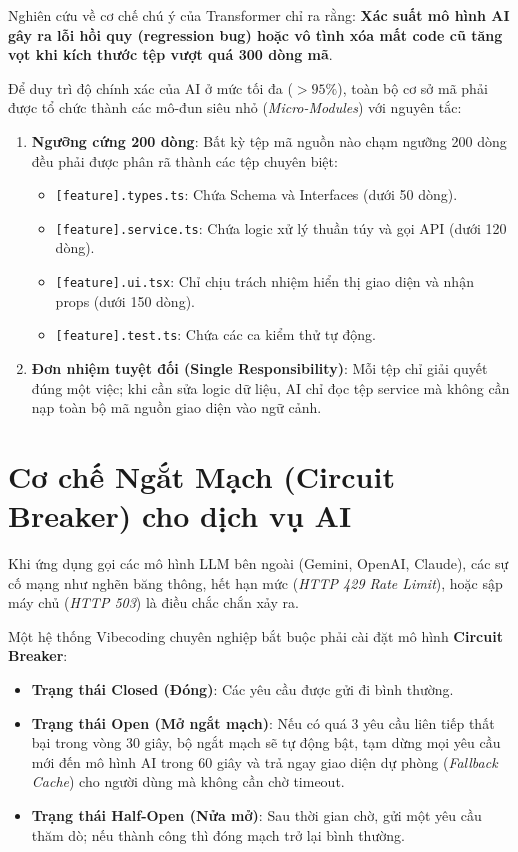 \documentclass[a4paper,11pt]{article}
\begin{document}
Nghiên cứu về cơ chế chú ý của Transformer chỉ ra rằng: \textbf{Xác suất mô hình AI gây ra lỗi hồi quy (regression bug) hoặc vô tình xóa mất code cũ tăng vọt khi kích thước tệp vượt quá 300 dòng mã}.

Để duy trì độ chính xác của AI ở mức tối đa ($> 95\%$), toàn bộ cơ sở mã phải được tổ chức thành các mô-đun siêu nhỏ (\textit{Micro-Modules}) với nguyên tắc:
\begin{enumerate}[label={\arabic*.}]
    \item \textbf{Ngưỡng cứng 200 dòng}: Bất kỳ tệp mã nguồn nào chạm ngưỡng 200 dòng đều phải được phân rã thành các tệp chuyên biệt:
    \begin{itemize}
        \item \texttt{[feature].types.ts}: Chứa Schema và Interfaces (dưới 50 dòng).
        \item \texttt{[feature].service.ts}: Chứa logic xử lý thuần túy và gọi API (dưới 120 dòng).
        \item \texttt{[feature].ui.tsx}: Chỉ chịu trách nhiệm hiển thị giao diện và nhận props (dưới 150 dòng).
        \item \texttt{[feature].test.ts}: Chứa các ca kiểm thử tự động.
    \end{itemize}
    \item \textbf{Đơn nhiệm tuyệt đối (Single Responsibility)}: Mỗi tệp chỉ giải quyết đúng một việc; khi cần sửa logic dữ liệu, AI chỉ đọc tệp service mà không cần nạp toàn bộ mã nguồn giao diện vào ngữ cảnh.
\end{enumerate}

\section{Cơ chế Ngắt Mạch (Circuit Breaker) cho dịch vụ AI}

Khi ứng dụng gọi các mô hình LLM bên ngoài (Gemini, OpenAI, Claude), các sự cố mạng như nghẽn băng thông, hết hạn mức (\textit{HTTP 429 Rate Limit}), hoặc sập máy chủ (\textit{HTTP 503}) là điều chắc chắn xảy ra.

Một hệ thống Vibecoding chuyên nghiệp bắt buộc phải cài đặt mô hình \textbf{Circuit Breaker}:
\begin{itemize}[leftmargin=1.5em]
    \item \textbf{Trạng thái Closed (Đóng)}: Các yêu cầu được gửi đi bình thường.
    \item \textbf{Trạng thái Open (Mở ngắt mạch)}: Nếu có quá 3 yêu cầu liên tiếp thất bại trong vòng 30 giây, bộ ngắt mạch sẽ tự động bật, tạm dừng mọi yêu cầu mới đến mô hình AI trong 60 giây và trả ngay giao diện dự phòng (\textit{Fallback Cache}) cho người dùng mà không cần chờ timeout.
    \item \textbf{Trạng thái Half-Open (Nửa mở)}: Sau thời gian chờ, gửi một yêu cầu thăm dò; nếu thành công thì đóng mạch trở lại bình thường.
\end{itemize}
\end{document}
